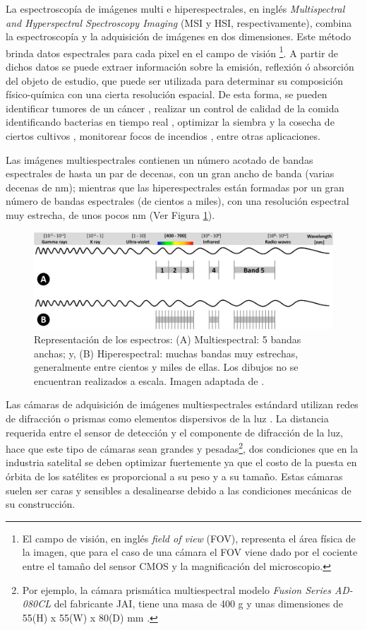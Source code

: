 La espectroscopía de imágenes multi e hiperespectrales, en inglés \textit{Multispectral and Hyperspectral Spectroscopy
Imaging} (MSI y HSI, respectivamente), combina la espectroscopía y la adquisición de imágenes en dos dimensiones.
Este método brinda datos espectrales para cada pixel en el campo de visión \footnote{El campo de visión, en inglés \textit{field of view} (FOV), representa el área física de la imagen, que para el caso de una cámara el FOV viene dado por el cociente entre el tamaño del sensor CMOS y la magnificación del microscopio.}. A partir de
dichos datos se puede extraer información sobre la emisión, reflexión ó absorción del objeto de estudio, que puede ser utilizada para determinar su composición físico-química con una cierta
resolución espacial. De esta forma, se pueden identificar tumores de un cáncer \cite{canc}, realizar un
control de calidad de la comida identificando bacterias en tiempo real \cite{food}, optimizar la siembra y la cosecha de ciertos cultivos \cite{cultiv}, monitorear focos de incendios \cite{fire}, entre otras
aplicaciones.

Las imágenes multiespectrales contienen un número acotado de bandas espectrales 
de hasta un par de decenas, con un gran ancho de banda (varias decenas de nm); 
mientras que las hiperespectrales están formadas por un gran número de bandas 
espectrales (de cientos a miles), con una resolución espectral muy estrecha, de 
unos pocos nm (Ver Figura \ref{fig:spectrus}).


\begin{figure}[H]
	\centering
	\includegraphics[scale=0.2]{Figs/plan_de_tesis/multivshyper.png}
	\caption{ Representación de los espectros: (A) Multiespectral: 5 
		bandas anchas; y, (B) Hiperespectral: muchas bandas muy estrechas, 
		generalmente entre cientos y miles de ellas. Los dibujos no se 
		encuentran 
		realizados a escala. Imagen adaptada de \cite{Adao2017}.}
	\label{fig:spectrus}
\end{figure}


Las cámaras de adquisición de imágenes multiespectrales estándard utilizan 
redes de difracción o prismas como elementos dispersivos de la luz \cite{5459162}. La 
distancia requerida entre el sensor de detección y el componente de difracción 
de la luz, hace que este tipo de cámaras sean grandes y pesadas\footnote{Por ejemplo, la cámara prismática multiespectral modelo \textit{Fusion Series AD-080CL} del fabricante JAI, tiene una masa de 400 g y unas dimensiones de 55(H) x 55(W) x 80(D) mm \cite{jaii}.}, dos condiciones que en la industria satelital se deben optimizar 
fuertemente ya que el costo de la puesta en órbita de los satélites es 
proporcional a su peso y a su tamaño. Estas cámaras suelen ser caras y 
sensibles a desalinearse debido a las condiciones mecánicas de su construcción. 

